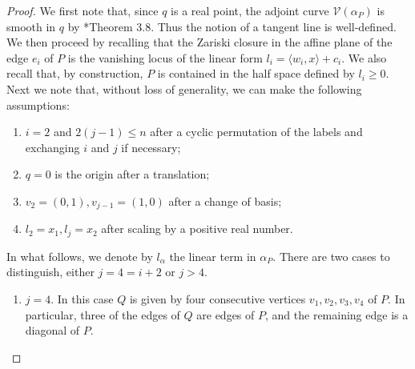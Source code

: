 \documentclass[a4paper,10pt]{amsart}
\theoremstyle{definition}
\theoremstyle{plain}
\newcommand{\cV}{{\mathcal V}}
\begin{document}
\begin{proof}
    We first note that, since $q$ is a real point, the adjoint curve $\cV(\alpha_P)$ is smooth in $q$ by \cite{KohnEtAl2024AdjCurves}*{Theorem 3.8}. Thus the notion of a tangent line is well-defined. We then proceed by recalling that the Zariski closure in the affine plane of the edge $e_i$ of $P$ is the vanishing locus of the linear form $l_i = \langle w_i, x \rangle + c_i$. We also recall that, by construction, $P$ is contained in the half space defined by $l_i \geq 0$.
    Next we note that, without loss of generality, we can make the following assumptions:
    \begin{enumerate}
        \item $i = 2$ and $2(j-1) \leq n$ after a cyclic permutation of the labels and exchanging $i$ and $j$ if necessary;
        \item $q = 0$ is the origin after a translation;
        \item $v_2 = (0,1), v_{j-1} = (1,0)$ after a change of basis;
        \item $l_2 = x_1, l_j = x_2$ after scaling by a positive real number.
    \end{enumerate}
    In what follows, we denote by $l_\alpha$ the linear term in $\alpha_P$. There are two cases to distinguish, either $j = 4 = i + 2$ or $j > 4$. 
    \begin{enumerate}
    \item[\textbf{Case 1}:] $j = 4$. In this case $Q$ is given by four consecutive vertices $v_1,v_2,v_3,v_4$ of $P$. In particular, three of the edges of $Q$ are edges of $P$, and the remaining edge is a diagonal of $P$.
    \begin{figure}[h]
\end{figure}
\end{enumerate}
\end{proof}
\end{document}
